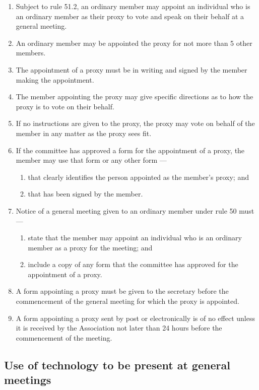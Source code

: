 \documentclass[../constitution.tex]{subfiles}
\begin{document}
\begin{enumerate}

\item Subject to rule 51.2, an ordinary member may appoint an individual who is an ordinary member as their proxy to vote and speak on their behalf at a general meeting.
\item An ordinary member may be appointed the proxy for not more than 5 other members.
\item The appointment of a proxy must be in writing and signed by the member making the appointment.
\item The member appointing the proxy may give specific directions as to how the proxy is to vote on their behalf.
\item If no instructions are given to the proxy, the proxy may vote on behalf of the member in any matter as the proxy sees fit.
\item If the committee has approved a form for the appointment of a proxy, the member may use that form or any other form ---

  \begin{enumerate}
  
  \item that clearly identifies the person appointed as the member's proxy; and
  \item that has been signed by the member.
  \end{enumerate}
\item Notice of a general meeting given to an ordinary member under rule 50 must ---

  \begin{enumerate}
  
  \item state that the member may appoint an individual who is an ordinary member as a proxy for the meeting; and
  \item include a copy of any form that the committee has approved for the appointment of a proxy.
  \end{enumerate}
\item A form appointing a proxy must be given to the secretary before the commencement of the general meeting for which the proxy is appointed.
\item A form appointing a proxy sent by post or electronically is of no effect unless it is received by the Association not later than 24 hours before the commencement of the meeting.
\end{enumerate}

\hypertarget{use-of-technology-to-be-present-at-general-meetings}{%
\subsection{Use of technology to be present at general meetings}\label{use-of-technology-to-be-present-at-general-meetings}}
\end{document}

